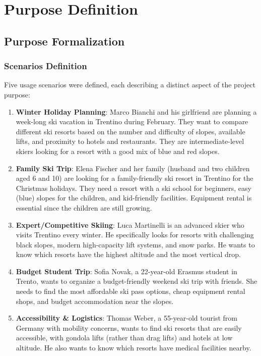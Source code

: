 \section{Purpose Definition}

\subsection{Purpose Formalization}

\subsubsection{Scenarios Definition}

Five usage scenarios were defined, each describing a distinct aspect of the project purpose:

\begin{enumerate}
    \item \textbf{Winter Holiday Planning}: Marco Bianchi and his girlfriend are planning a week-long ski vacation in Trentino during February. They want to compare different ski resorts based on the number and difficulty of slopes, available lifts, and proximity to hotels and restaurants. They are intermediate-level skiers looking for a resort with a good mix of blue and red slopes.

    \item \textbf{Family Ski Trip}: Elena Fischer and her family (husband and two children aged 6 and 10) are looking for a family-friendly ski resort in Trentino for the Christmas holidays. They need a resort with a ski school for beginners, easy (blue) slopes for the children, and kid-friendly facilities. Equipment rental is essential since the children are still growing.

    \item \textbf{Expert/Competitive Skiing}: Luca Martinelli is an advanced skier who visits Trentino every winter. He specifically looks for resorts with challenging black slopes, modern high-capacity lift systems, and snow parks. He wants to know which resorts have the highest altitude and the most vertical drop.

    \item \textbf{Budget Student Trip}: Sofia Novak, a 22-year-old Erasmus student in Trento, wants to organize a budget-friendly weekend ski trip with friends. She needs to find the most affordable ski pass options, cheap equipment rental shops, and budget accommodation near the slopes.

    \item \textbf{Accessibility \& Logistics}: Thomas Weber, a 55-year-old tourist from Germany with mobility concerns, wants to find ski resorts that are easily accessible, with gondola lifts (rather than drag lifts) and hotels at low altitude. He also wants to know which resorts have medical facilities nearby.
\end{enumerate}

